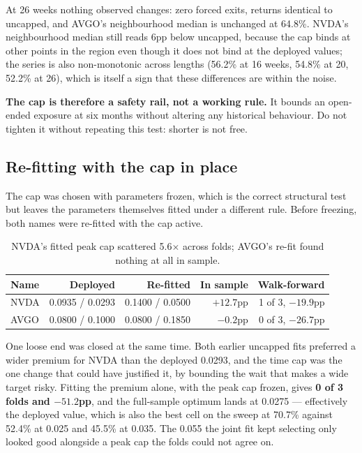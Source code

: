 \documentclass[11pt]{article}
\begin{document}
At 26 weeks nothing observed changes: zero forced exits, returns identical to uncapped, and
AVGO's neighbourhood median is unchanged at 64.8\%. NVDA's neighbourhood median still reads 6pp
below uncapped, because the cap binds at other points in the region even though it does not bind
at the deployed values; the series is also non-monotonic across lengths (56.2\% at 16 weeks,
54.8\% at 20, 52.2\% at 26), which is itself a sign that these differences are within the noise.

\textbf{The cap is therefore a safety rail, not a working rule.} It bounds an open-ended exposure
at six months without altering any historical behaviour. Do not tighten it without repeating this
test: shorter is not free.

\subsection{Re-fitting with the cap in place}

The cap was chosen with parameters frozen, which is the correct structural test but leaves the
parameters themselves fitted under a different rule. Before freezing, both names were re-fitted
with the cap active.

\begin{table}[H]\centering\small
\begin{tabular}{lrrrr}
\toprule
\textbf{Name} & \textbf{Deployed} & \textbf{Re-fitted} & \textbf{In sample} &
\textbf{Walk-forward}\\
\midrule
\rowcolor{bckeep} NVDA & 0.0935 / 0.0293 & 0.1400 / 0.0500 & $+12.7$pp & 1 of 3, $-19.9$pp\\
AVGO & 0.0800 / 0.1000 & 0.0800 / 0.1850 & $-0.2$pp & 0 of 3, $-26.7$pp\\
\bottomrule
\end{tabular}
\caption{NVDA's fitted peak cap scattered 5.6$\times$ across folds; AVGO's re-fit found nothing at
all in sample.}
\end{table}

One loose end was closed at the same time. Both earlier uncapped fits preferred a wider premium
for NVDA than the deployed 0.0293, and the time cap was the one change that could have justified
it, by bounding the wait that makes a wide target risky. Fitting the premium alone, with the peak
cap frozen, gives \textbf{0 of 3 folds and $-51.2$pp}, and the full-sample optimum lands at
0.0275 --- effectively the deployed value, which is also the best cell on the sweep at 70.7\%
against 52.4\% at 0.025 and 45.5\% at 0.035. The 0.055 the joint fit kept selecting only looked
good alongside a peak cap the folds could not agree on.
\end{document}
